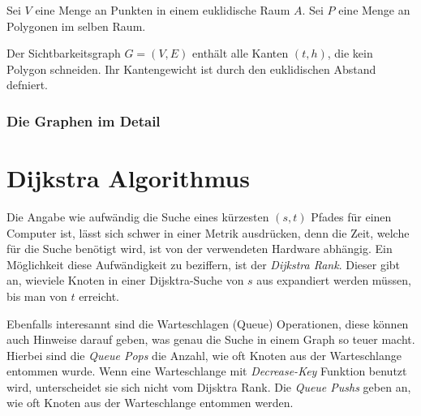 
\begin{definition}[Sichtbarkeitsgraph]
    Sei $V$ eine Menge an Punkten in einem euklidische Raum $A$. Sei $P$ eine Menge an Polygonen im selben Raum.

    Der Sichtbarkeitsgraph $G = (V, E)$ enthält alle Kanten $(t, h)$, die kein Polygon schneiden.
    Ihr Kantengewicht ist durch den euklidischen Abstand defniert.
\end{definition}



\subsubsection{Die Graphen im Detail}


\section{Dijkstra Algorithmus}

Die Angabe wie aufwändig die Suche eines kürzesten $(s, t)$ Pfades für einen Computer ist, lässt sich schwer in einer Metrik ausdrücken, denn die Zeit, welche für die Suche benötigt wird, ist von der verwendeten Hardware abhängig.
Ein Möglichkeit diese Aufwändigkeit zu beziffern, ist der \emph{Dijkstra Rank}.
Dieser gibt an, wieviele Knoten in einer Dijsktra-Suche von $s$ aus expandiert werden müssen, bis man von $t$ erreicht.


Ebenfalls interesannt sind die Warteschlagen (Queue) Operationen, diese können auch Hinweise darauf geben, was genau die Suche in einem Graph so teuer macht.
Hierbei sind die \emph{Queue Pops} die Anzahl, wie oft Knoten aus der Warteschlange entommen wurde.
Wenn eine Warteschlange mit \emph{Decrease-Key} Funktion benutzt wird, unterscheidet sie sich nicht vom Dijsktra Rank.
Die \emph{Queue Pushs} geben an, wie oft Knoten aus der Warteschlange entommen werden.


